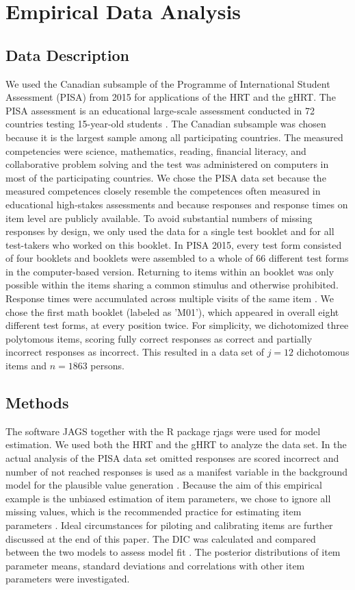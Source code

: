 \documentclass[a4paper,man,apacite,floatsintext,donotrepeattitle]{apa6}
\begin{document}
\section{Empirical Data Analysis}
\subsection{Data Description}
We used the Canadian subsample of the Programme of International Student Assessment (PISA) from 2015 for applications of the HRT and the gHRT. The PISA assessment is an educational large-scale assessment conducted in 72 countries testing 15-year-old students \cite{PISA.2015tech}. The Canadian subsample was chosen because it is the largest sample among all participating countries. The measured competencies were science, mathematics, reading, financial literacy, and collaborative problem solving and the test was administered on computers in most of the participating countries. We chose the PISA data set because the measured competences closely resemble the competences often measured in educational high-stakes assessments and because responses and response times on item level are publicly available. To avoid substantial numbers of missing responses by design, we only used the data for a single test booklet and for all test-takers who worked on this booklet. In PISA 2015, every test form consisted of four booklets and booklets were assembled to a whole of 66 different test forms in the computer-based version. Returning to items within an booklet was only possible within the items sharing a common stimulus and otherwise prohibited. Response times were accumulated across multiple visits of the same item \cite[pp. 45-47]{PISA.2015tech}. We chose the first math booklet (labeled as 'M01'), which appeared in overall eight different test forms, at every position twice. For simplicity, we dichotomized three polytomous items, scoring fully correct responses as correct and partially incorrect responses as incorrect. This resulted in a data set of $j = 12$ dichotomous items and $n = 1863$ persons.  

\subsection{Methods}
The software JAGS \cite{Plummer.jags} together with the R package rjags \cite{Plummer.rjags} were used for model estimation. We used both the HRT and the gHRT to analyze the data set. In the actual analysis of the PISA data set omitted responses are scored incorrect and number of not reached responses is used as a manifest variable in the background model for the plausible value generation \cite{PISA.2015tech}. Because the aim of this empirical example is the unbiased estimation of item parameters, we chose to ignore all missing values, which is the recommended practice for estimating item parameters \cite{Finch.2008}. Ideal circumstances for piloting and calibrating items are further discussed at the end of this paper. The DIC was calculated and compared between the two models to assess model fit \cite{Spiegelhalter.2002}. The posterior distributions of item parameter means, standard deviations and correlations with other item parameters were investigated. 
\end{document}
